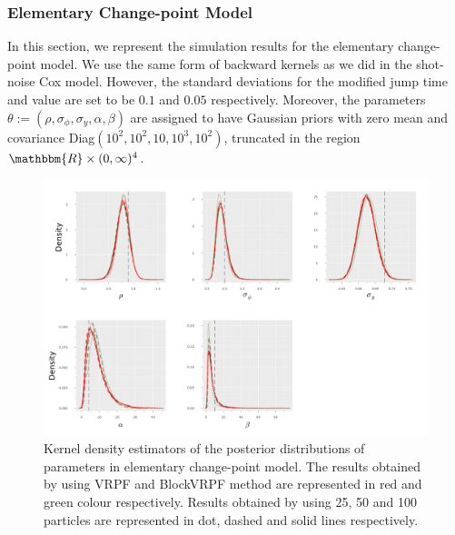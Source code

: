 \documentclass[12pt,a4paper]{article}
\begin{document}
\subsubsection{Elementary Change-point Model}
In this section, we represent the simulation results for the elementary change-point model. We use the same form of backward kernels as we did in the shot-noise Cox model. However, the standard deviations for the modified jump time and value are set to be \(0.1\) and \(0.05\) respectively. Moreover, the parameters \(\theta:=(\rho,\sigma_\phi,\sigma_y,\alpha,\beta)\) are assigned to have Gaussian priors with zero mean and covariance Diag\((10^2,10^2,10,10^3,10^2)\), truncated in the region \(\mathbbm{R}\times(0,\infty)^4\).
\begin{figure}[htb!]
    \centering
    \includegraphics[width=\textwidth]{PG-simulation-CPRes1.pdf}
    \caption{Kernel density estimators of the posterior distributions of parameters in elementary change-point model. The results obtained by using VRPF and BlockVRPF method are represented in red and green colour respectively. Results obtained by using 25, 50 and 100 particles are represented in dot, dashed and solid lines respectively.}
    \label{Figure: PG-Simulation-CPRes1}
\end{figure}
\end{document}
